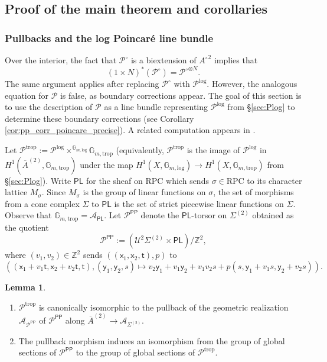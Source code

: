 \documentclass[11pt]{article}
\def\RPC{\mathrm{RPC}}
\def\Glog{\mathbb{G}_{m,\log}}
\newcommand{\trop}{\mathrm{trop}}
\renewcommand{\log}{\mathrm{log}}
\newcommand{\barA}{\overline{A}}
\newcommand{\sfpp}{\mathsf{PP}}
\theoremstyle{definition}
\newtheorem{lemma}[definition]{Lemma}
\begin{document}
\subsection{Proof of the main theorem and corollaries}\label{sec:prf_wt_thm}


\subsubsection{Pullbacks and the log Poincar\'e line bundle}
\label{sec:pullbacks_poincare}

Over the interior, the fact that $\mathcal{P}^{\circ}$ is a biextension of ${A^{\circ}}^{2}$ implies that
$$(1\times N)^{\ast}(\mathcal{P}^{\circ})={\mathcal{P}^{\circ}}^{\otimes N}.$$
The same argument applies after replacing $\mathcal{P}^{\circ}$ with $\mathcal{P}^{\log}$.
However, the analogous equation for $\mathcal{P}$ is false, as
boundary corrections appear. The goal of this section is to use the description of $\mathcal{P}$
as a line bundle representing $\mathcal{P}^{\log}$ from \S\ref{sec:Plog} to determine these boundary corrections
(see Corollary \ref{cor:pp_corr_poincare_precise}). A related computation appears in \cite{BGHdJ}.

Let $\mathcal{P}^{\trop}:=\mathcal{P}^{\log}\times^{\mathbb{G}_{m,\log}}\mathbb{G}_{m,\trop}$ (equivalently,
$\mathcal{P}^{\trop}$ is the image of $\mathcal{P}^{\log}$ in $H^{1}(\barA^{(2)},\mathbb{G}_{m,\trop})$ under the map
$H^1(X, \Glog) \longrightarrow H^1(X, \mathbb G_{m,\trop})$ from \S\ref{sec:Plog}).
Write $\mathsf{PL}$ for the sheaf on $\RPC$ which sends $\sigma\in \RPC$ to its character 
lattice $M_{\sigma}$. Since $M_{\sigma}$ is the group of linear functions on $\sigma$, the set of morphisms
from a cone complex $\Sigma$ to $\mathsf{PL}$ is the set of strict piecewise linear functions
on $\Sigma$. Observe that $\mathbb{G}_{m,\trop}=\mathcal{A}_{\mathsf{PL}}$.
Let $\mathcal{P}^{\sfpp}$ denote the $\mathsf{PL}$-torsor on $\Sigma^{(2)}$ obtained as the quotient
$$\mathcal{P}^{\sfpp}:=(\mathcal U^2\Sigma^{(2)}\times\mathsf{PL})/\mathbb{Z}^{2},$$
where $(v_1,v_2)\in \mathbb{Z}^{2}$ sends $((\mathsf{x}_1,\mathsf{x}_2,\mathsf{t}),p)$ to
$$((\mathsf{x}_1+v_1\mathsf{t},\mathsf{x}_2+v_2\mathsf{t},\mathsf{t}),(\mathsf{y}_1,\mathsf{y}_2,s)\mapsto v_2\mathsf{y}_1+v_1\mathsf{y}_2+v_1v_2s+p(s,\mathsf{y}_1+v_1s,\mathsf{y}_2+v_2s)).$$

\begin{lemma}\label{lem:glob_secs_ptrop}
	\begin{enumerate}[label = (\alph*)]
		\item $\mathcal{P}^{\trop}$ is canonically isomorphic to the pullback of the geometric realization $\mathcal{A}_{\mathcal{P}^{\sfpp}}$ of $\mathcal{P}^{\sfpp}$
			along $\barA^{(2)}\to \mathcal{A}_{\Sigma^{(2)}}$.
		\item The pullback morphism induces an isomorphism from the group of global sections of $\mathcal{P}^{\sfpp}$ to the
			group of global sections of $\mathcal{P}^{\trop}$.
	\end{enumerate}
\end{lemma}
\end{document}
